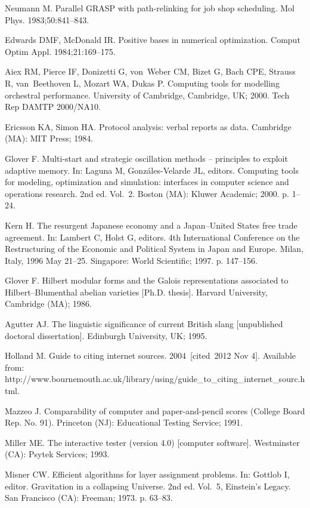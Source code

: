\documentclass{tADR2e}
\begin{document}
\begin{thebibliography}{12}

Neumann M. Parallel GRASP with path-relinking for job shop scheduling. Mol
  Phys. 1983;50:841--843.

Edwards DMF, McDonald IR. Positive bases in numerical optimization. Comput
  Optim Appl. 1984;21:169--175.

Aiex RM, Pierce IF, Donizetti G, von~Weber CM, Bizet G, Bach CPE, Strauss
  R, van~Beethoven L, Mozart WA, Dukas P. Computing tools for modelling
  orchestral performance. University of Cambridge, Cambridge, UK; 2000. Tech
  Rep DAMTP 2000/NA10.

Ericsson KA, Simon HA. Protocol analysis: verbal reports as data. Cambridge
  (MA): MIT Press; 1984.

Glover F. Multi-start and strategic oscillation methods -- principles to exploit
  adaptive memory. In: Laguna M, Gonz\'{a}les-Velarde JL, editors. Computing
  tools for modeling, optimization and simulation: interfaces in computer
  science and operations research. 2nd ed. Vol.~2. Boston (MA): Kluwer Academic;
  2000. p. 1--24.

Kern H. The resurgent Japanese economy and a Japan--United States free
  trade agreement. In: Lambert C, Holst G, editors. 4th International
  Conference on the Restructuring of the Economic and Political System in Japan
  and Europe. Milan, Italy, 1996 May 21--25. Singapore: World Scientific;
  1997. p. 147--156.

Glover F. Hilbert modular forms and the Galois representations associated to
  Hilbert--Blumenthal abelian varieties [Ph.D. thesis]. Harvard
  University, Cambridge (MA); 1986.

Agutter AJ. The linguistic significance of current British slang [unpublished
  doctoral dissertation]. Edinburgh University, UK; 1995.

Holland M. Guide to citing internet sources. 2004~[cited~2012 Nov 4].
  Available from: http://www.bournemouth.ac.uk/library/using/guide\_to\_citing\_internet\_sourc.html.

Mazzeo J. Comparability of computer and paper-and-pencil scores (College Board
  Rep. No. 91). Princeton (NJ): Educational Testing Service; 1991.

Miller ME. The interactive tester (version 4.0) [computer software].
  Westminster (CA): Psytek Services; 1993.

Misner CW. Efficient algorithms for layer assignment problems. In: Gottlob I,
  editor. Gravitation in a collapsing Universe. 2nd ed. Vol.~5, Einstein's Legacy.
   San Francisco (CA): Freeman; 1973. p. 63--83.

\end{thebibliography}
\end{document}
